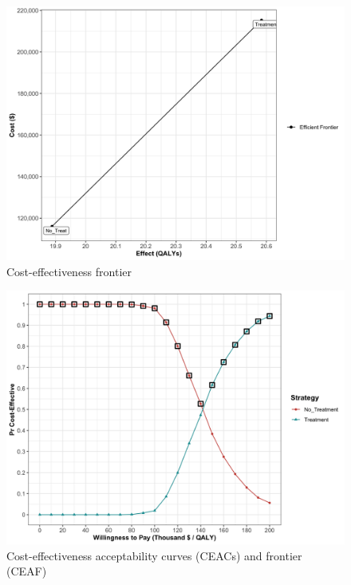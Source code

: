 \documentclass[]{article}
\begin{document}
\begin{figure}
\centering
\includegraphics{../figs/05b_cea-frontier-psa.png}
\caption{Cost-effectiveness frontier\label{fig:05b_cea-frontier-psa}}
\end{figure}

\begin{figure}
\centering
\includegraphics{../figs/05b_ceac-ceaf.png}
\caption{Cost-effectiveness acceptability curves (CEACs) and frontier
(CEAF)\label{fig:05b_ceac-ceaf}}
\end{figure}
\end{document}
